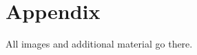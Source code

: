 \documentclass[conference,compsoc]{IEEEtran}
\begin{document}



%
%
%
\newpage 
\section{Appendix}
All images and additional material go there.
\end{document}
